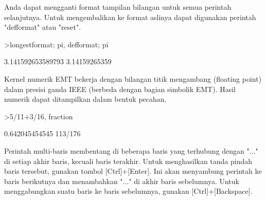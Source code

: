 \documentclass[a4paper,10pt]{article}
\begin{document}
\begin{eulernotebook}
\begin{eulercomment}
\begin{eulercomment}
\begin{eulercomment}
\begin{eulercomment}
\begin{eulercomment}
Anda dapat mengganti format tampilan bilangan untuk semua perintah
selanjutnya. Untuk mengembalikan ke format aslinya dapat digunakan
perintah "defformat" atau "reset".
\end{eulercomment}
\begin{eulerprompt}
>longestformat; pi, defformat; pi
\end{eulerprompt}
\begin{euleroutput}
  3.141592653589793
  3.14159265359
\end{euleroutput}
\begin{eulercomment}
Kernel numerik EMT bekerja dengan bilangan titik mengambang (floating point)
dalam presisi ganda IEEE (berbeda dengan bagian simbolik EMT). Hasil numerik
dapat ditampilkan dalam bentuk pecahan.
\end{eulercomment}
\begin{eulerprompt}
>5/11+3/16, fraction %
\end{eulerprompt}
\begin{euleroutput}
  0.642045454545
  113/176
\end{euleroutput}
\begin{eulercomment}
Perintah multi-baris membentang di beberapa baris yang terhubung
dengan "..." di setiap akhir baris, kecuali baris terakhir. Untuk
menghasilkan tanda pindah baris tersebut, gunakan tombol
[Ctrl]+[Enter]. Ini akan menyambung perintah ke baris berikutnya dan
menambahkan "..." di akhir baris sebelumnya. Untuk menggabungkan suatu
baris ke baris sebelumnya, gunakan [Ctrl]+[Backspace].


\end{eulercomment}
\end{eulercomment}
\end{eulercomment}
\end{eulercomment}
\end{eulercomment}
\end{eulernotebook}
\end{document}
